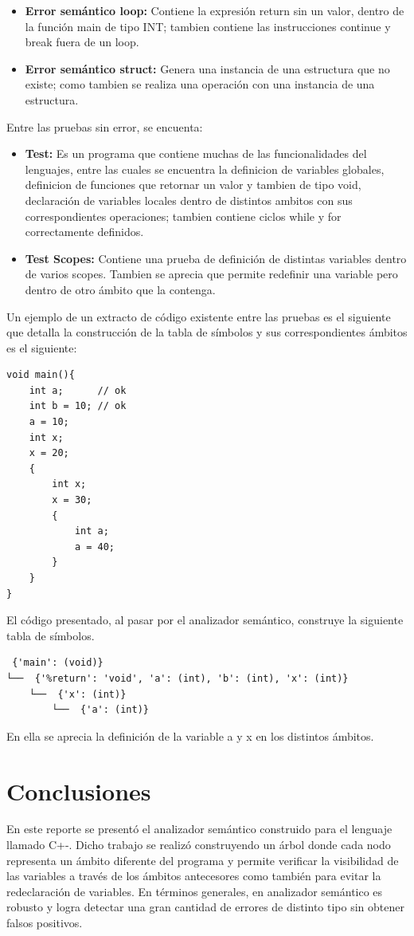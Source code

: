 \documentclass[12pt]{article}
\begin{document}
\begin{itemize}
\begin{itemize}
\item \textbf{Error semántico loop: } Contiene la expresión return sin un valor, dentro de la función main de tipo INT; tambien contiene las instrucciones continue y break fuera de un loop.  

\item \textbf{Error semántico struct: } Genera una instancia de una estructura que no existe; como tambien se realiza una operación con una instancia de una estructura.
\end{itemize}

Entre las pruebas sin error, se encuenta:
\begin{itemize}
\item \textbf{Test: } Es un programa que contiene muchas de las funcionalidades del lenguajes, entre las cuales se encuentra la definicion de variables globales, definicion de funciones que retornar un valor y tambien de tipo void, declaración de variables locales dentro de distintos ambitos con sus correspondientes operaciones; tambien contiene ciclos while y for correctamente definidos.

\item \textbf{Test Scopes: } Contiene una prueba de definición de distintas variables dentro de varios scopes. Tambien se aprecia que permite redefinir una variable pero dentro de otro ámbito que la contenga. 
\end{itemize}
\clearpage
Un ejemplo de un extracto de c\'odigo existente entre las pruebas es el siguiente que detalla la construcci\'on de la tabla de s\'imbolos y sus correspondientes \'ambitos es el siguiente:
\begin{verbatim}
void main(){
    int a;      // ok
    int b = 10; // ok
    a = 10;
    int x;
    x = 20;
    {
        int x;
        x = 30;
        {
            int a;
            a = 40;
        }
    }
}
\end{verbatim}

El c\'odigo presentado, al pasar por el analizador sem\'antico, construye la siguiente tabla de s\'imbolos.
\begin{verbatim}
 {'main': (void)}
└──  {'%return': 'void', 'a': (int), 'b': (int), 'x': (int)}
    └──  {'x': (int)}
        └──  {'a': (int)}
\end{verbatim}
En ella se aprecia la definici\'on de la variable a y x en los distintos ámbitos.


\section*{Conclusiones}
En este reporte se present\'o el analizador sem\'antico construido para el lenguaje llamado C+-. Dicho trabajo se realiz\'o construyendo un \'arbol donde cada nodo representa un \'ambito diferente del programa y permite verificar la visibilidad de las variables a trav\'es de los \'ambitos antecesores como tambi\'en para evitar la redeclaraci\'on de variables.
En t\'erminos generales, en analizador sem\'antico es robusto y logra detectar una gran cantidad de errores de distinto tipo sin obtener falsos positivos.




\end{itemize}
\end{document}
